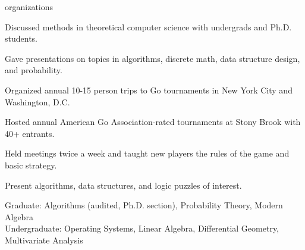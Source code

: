 \documentclass{cv}
\begin{document}
\begin{cvsection}{organizations}
  {
    \item Discussed methods in theoretical computer science with undergrads and Ph.D. students.
    \item Gave presentations on topics in algorithms, discrete math, data structure design, and probability.
  }
  {
    \item Organized annual 10-15 person trips to Go tournaments in New York City and Washington, D.C.
    \item Hosted annual American Go Association-rated tournaments at Stony Brook with 40+ entrants.
    \item Held meetings twice a week and taught new players the rules of the game and basic strategy.
  }
  {
    \item Present algorithms, data structures, and logic puzzles of interest.
  } 
\end{cvsection}

Graduate: Algorithms (audited, Ph.D. section), Probability Theory, Modern Algebra \\
Undergraduate: Operating Systems, Linear Algebra, Differential Geometry, Multivariate Analysis
\end{document}

